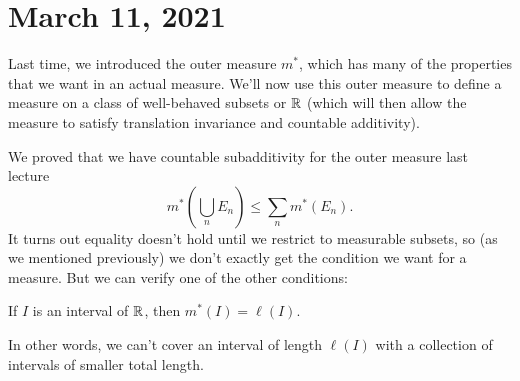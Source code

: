 \pagebreak\section*{March 11, 2021}

Last time, we introduced the outer measure $m^\ast$, which has many of the properties that we want in an actual measure. We'll now use this outer measure to define a measure on a class of well-behaved subsets or $\mathbb R$ (which will then allow the measure to satisfy translation invariance and countable additivity). 

We proved that we have countable subadditivity for the outer measure last lecture
\[
    m^\ast \left(\bigcup_{n} E_n \right) \le \sum_n m^\ast(E_n).
\]
It turns out equality doesn't hold until we restrict to measurable subsets, so (as we mentioned previously) we don't exactly get the condition we want for a measure. But we can verify one of the other conditions:

\begin{proposition}
If $I$ is an interval of $\mathbb R$, then $m^\ast(I) = \ell(I)$.
\end{proposition}

In other words, we can't cover an interval of length $\ell(I)$ with a collection of intervals of smaller total length.

